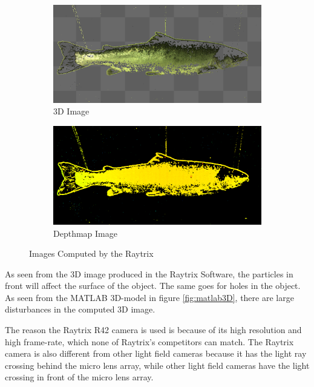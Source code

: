 \begin{figure}[h]
    \medskip
    \begin{subfigure}{0.49\textwidth}
        \includegraphics[width=\linewidth]{images/hardware/raytrix_3D_image}
        \caption{3D Image} 
        \label{fig:3d_image}
    \end{subfigure}\hspace*{\fill}
    \begin{subfigure}{0.49\textwidth}
        \includegraphics[width=\linewidth]{images/hardware/raytrix_depthmap_image}
        \caption{Depthmap Image} 
        \label{fig:depthmap}
    \end{subfigure}
    \caption{Images Computed by the Raytrix} 
    \label{fig:raytrix_captures}
\end{figure}

As seen from the 3D image produced in the Raytrix Software, the particles in front will affect the surface of the object. The same goes for holes in the object. As seen from the MATLAB 3D-model in figure \ref{fig:matlab3D}, there are large disturbances in the computed 3D image.
\newline

The reason the Raytrix R42 camera is used is because of its high resolution and high frame-rate, which none of Raytrix's competitors can match. The Raytrix camera is also different from other light field cameras because it has the light ray crossing behind the micro lens array, while other light field cameras have the light crossing in front of the micro lens array.\cite{article:stereo_vs_plenoptic}

